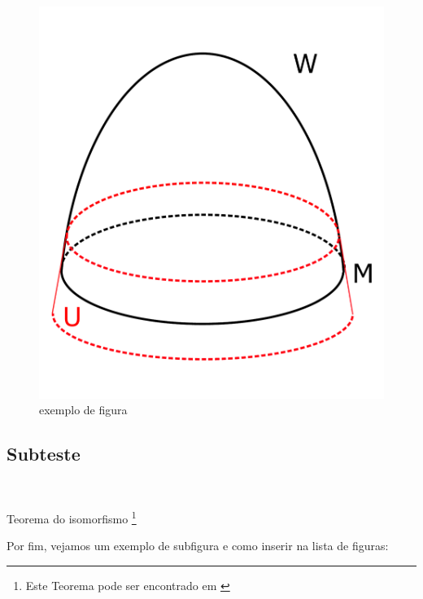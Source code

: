 \documentclass[12pt,oneside]{book} %
\begin{document}
    \begin{figure}[h] %
        \begin{center}
            \includegraphics[scale=0.2]{varied_c_bordo.pdf}
        \end{center}
        \caption{exemplo de figura}
    \end{figure}

    \subsection{Subteste}

    \

    \par Teorema do isomorfismo \footnote{Este Teorema pode ser encontrado em \cite{exemplo 1}}

    \par Por fim, vejamos um exemplo de subfigura e como inserir na lista de figuras: \vspace{1.5cm}
\end{document}
